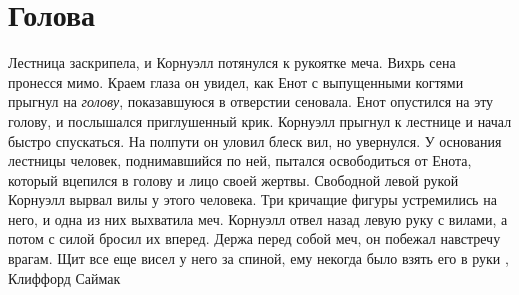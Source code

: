  
 
 
 
 
\chapter{Голова}

Лестница заскрипела, и Корнуэлл потянулся к рукоятке меча. Вихрь сена пронесся
мимо. Краем глаза он увидел, как Енот с выпущенными когтями прыгнул на
\emph{голову}, показавшуюся в отверстии сеновала. Енот опустился на эту голову,
и послышался приглушенный крик. Корнуэлл прыгнул к лестнице и начал быстро
спускаться. На полпути он уловил блеск вил, но увернулся. У основания лестницы
человек, поднимавшийся по ней, пытался освободиться от Енота, который вцепился
в голову и лицо своей жертвы. Свободной левой рукой Корнуэлл вырвал вилы у
этого человека.  Три кричащие фигуры устремились на него, и одна из них
выхватила меч. Корнуэлл отвел назад левую руку с вилами, а потом с силой бросил
их вперед. Держа перед собой меч, он побежал навстречу врагам. Щит все еще
висел у него за спиной, ему некогда было взять его в руки
, Клиффорд Саймак
